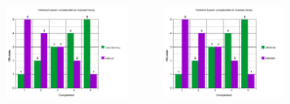 \documentclass{article}
\begin{document}
\begin{itemize}
\begin{itemize}
		\begin{center}
			\includegraphics[width=5cm, height=3cm]{O4-H1}
			\includegraphics[width=5cm, height=3cm]{O4-H2}
		\end{center}
	\end{itemize}


\end{itemize}
\end{document}
